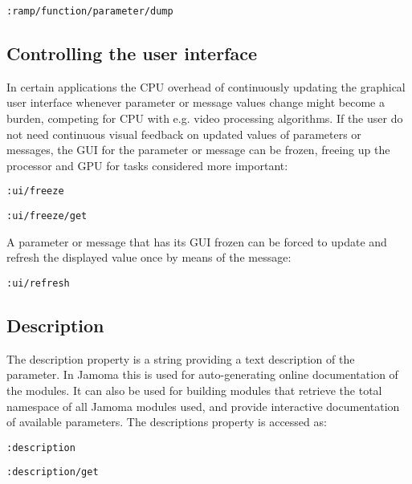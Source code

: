 \documentclass{sig-alternate}
\begin{document}
\texttt{:ramp/function/parameter/dump}





\subsection{Controlling the user interface} %
\label{sub:controlling_the_user_interface}

In certain applications the CPU overhead of continuously updating the graphical user interface whenever parameter or message values change might become a burden, competing for CPU with e.g. video processing algorithms. If the user do not need continuous visual feedback on updated values of parameters or messages, the GUI for the parameter or message can be frozen, freeing up the processor and GPU for tasks considered more important:

\texttt{:ui/freeze}

\texttt{:ui/freeze/get}

A parameter or message that has its GUI frozen can be forced to update and refresh the displayed value once by means of the message:

\texttt{:ui/refresh}






\subsection{Description} %
\label{sub:description}

The description property is a string providing a text description of the parameter. In Jamoma this is used for auto-generating online documentation of the modules. It can also be used for building modules that retrieve the total namespace of all Jamoma modules used, and provide interactive documentation of available parameters. The descriptions property is accessed as:

\texttt{:description}

\texttt{:description/get}

\end{document}
